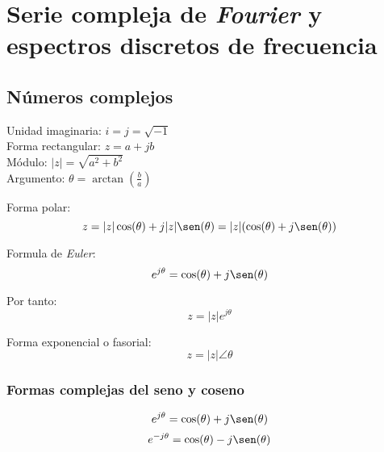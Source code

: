 \chapter{Serie compleja de \emph{Fourier} y espectros discretos de frecuencia}

\section{Números complejos}

\begin{figure}[H]
    \centering
    
\end{figure}

\begin{center}
    Unidad imaginaria: $i=j=\sqrt{-1}$\\
    Forma rectangular: $z=a+jb$\\
    Módulo: $|z|=\sqrt{a^2+b^2}$\\
    Argumento: $\theta=\arctan(\frac{b}{a})$\\
\end{center}

Forma polar:
\begin{equation*}
    z=|z|\cos(\theta)+j|z|\sen(\theta)
        =|z|(\cos(\theta)+j\sen(\theta))
\end{equation*}

Formula de \emph{Euler}:
\begin{equation}
    e^{j\theta}=\cos(\theta)+j\sen(\theta)
\end{equation}

Por tanto:
\begin{equation*}
    z=|z|e^{j\theta}
\end{equation*}

Forma exponencial o fasorial:
\begin{equation*}
    z=|z|\angle\theta
\end{equation*}

\subsection{Formas complejas del seno y coseno}

\begin{equation}
    e^{j\theta}=\cos(\theta)+j\sen(\theta)
    \label{e1}
\end{equation}
\begin{equation}
    e^{-j\theta}=\cos(\theta)-j\sen(\theta)
    \label{e2}
\end{equation}

